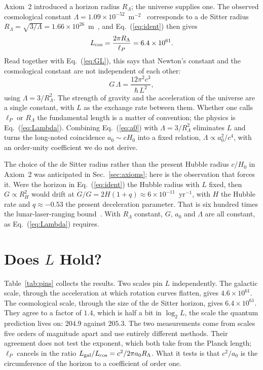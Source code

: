 \documentclass[aps,prd,twocolumn,superscriptaddress,nofootinbib,showkeys]{revtex4-2}
\begin{document}
Axiom~2 introduced a horizon radius $R_\Lambda$; the universe supplies one. The observed cosmological constant $\Lambda = 1.09\times10^{-52}$~m$^{-2}$~\cite{planck2018} corresponds to a de Sitter radius $R_\Lambda = \sqrt{3/\Lambda} = 1.66\times10^{26}$~m~\cite{gibbons1977}, and Eq.~(\ref{eq:ident}) then gives
\begin{equation}
L_{\rm cos} = \frac{2\pi R_\Lambda}{\ell_P} = 6.4\times10^{61}.
\label{eq:Lcos}
\end{equation}
Read together with Eq.~(\ref{eq:GL}), this says that Newton's constant and the cosmological constant are not independent of each other:
\begin{equation}
G\,\Lambda = \frac{12\pi^2c^3}{\hbar\,L^2},
\label{eq:Lambda}
\end{equation}
using $\Lambda = 3/R_\Lambda^2$. The strength of gravity and the acceleration of the universe are a single constant, with $L$ as the exchange rate between them. Whether one calls $\ell_P$ or $R_\Lambda$ the fundamental length is a matter of convention; the physics is Eq.~(\ref{eq:Lambda}). Combining Eq.~(\ref{eq:a0}) with $\Lambda = 3/R_\Lambda^2$ eliminates $L$ and turns the long-noted coincidence $a_0\sim cH_0$ into a fixed relation, $\Lambda \propto a_0^2/c^4$, with an order-unity coefficient we do not derive.

The choice of the de Sitter radius rather than the present Hubble radius $c/H_0$ in Axiom~2 was anticipated in Sec.~\ref{sec:axioms}; here is the observation that forces it. Were the horizon in Eq.~(\ref{eq:ident}) the Hubble radius with $L$ fixed, then $G\propto R_H^2$ would drift at $\dot G/G = 2H(1+q)\approx6\times10^{-11}$~yr$^{-1}$, with $H$ the Hubble rate and $q\approx-0.53$ the present deceleration parameter. That is six hundred times the lunar-laser-ranging bound~\cite{hofmann2018}. With $R_\Lambda$ constant, $G$, $a_0$ and $\Lambda$ are all constant, as Eq.~(\ref{eq:Lambda}) requires.

\section{Does $L$ Hold?}
\label{sec:hold}

Table~\ref{tab:pins} collects the results. Two scales pin $L$ independently. The galactic scale, through the acceleration at which rotation curves flatten, gives $4.6\times10^{61}$. The cosmological scale, through the size of the de Sitter horizon, gives $6.4\times10^{61}$. They agree to a factor of $1.4$, which is half a bit in $\log_2 L$, the scale the quantum prediction lives on: $204.9$ against $205.3$. The two measurements come from scales five orders of magnitude apart and use entirely different methods. Their agreement does not test the exponent, which both take from the Planck length; $\ell_P$ cancels in the ratio $L_{\rm gal}/L_{\rm cos} = c^2/2\pi a_0R_\Lambda$. What it tests is that $c^2/a_0$ is the circumference of the horizon to a coefficient of order one.
\end{document}
